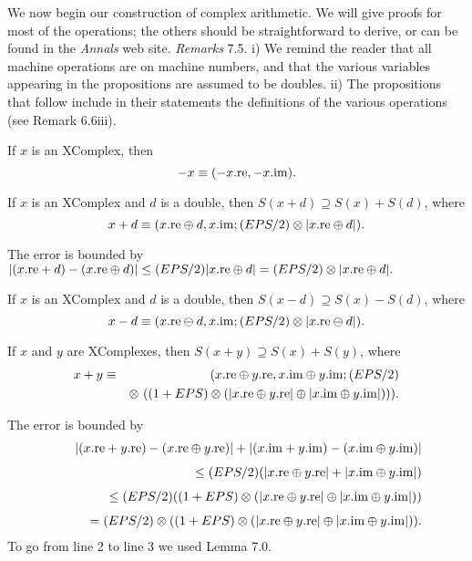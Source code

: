 We now begin our construction of complex arithmetic. We will give proofs for most of the operations; the others should be straightforward to derive,
or can be found in the {\it Annals} web site.
{\it Remarks} 7.5.
i) We remind the reader that all machine operations are on machine numbers, and that the various variables appearing in the propositions are assumed to be doubles.
ii) The propositions that follow include in their statements the definitions of the various operations (see Remark 6.6iii).

If $x$ is an {\rm XComplex,} then 
$$-x \equiv (-x.{\rm re},-x.{\rm im}).$$ 
\endproclaim

If $x$ is an {\rm XComplex} and $d$ is a double{\rm ,} then 
$S(x + d) \supseteq S(x) + S(d)${\rm ,} where 
 $$x + d \equiv (x.{\rm re} \oplus d, x.{\rm im};
(EPS/2)\otimes |x.{\rm re} \oplus d|).$$
\endproclaim

The  error is bounded by  
\hfill ${\displaystyle |(x.{\rm re} + d) - (x.{\rm re} \oplus d)|
\le (EPS/2) | x.{\rm re} \oplus d|
  =  (EPS/2) \otimes | x.{\rm re} \oplus d|.}$ \enddemo

If $x$ is an {\rm XComplex} and $d$ is a double{\rm ,} then 
$S(x - d) \supseteq S(x) - S(d)${\rm ,} where 
 $$x - d \equiv (x.{\rm re} \ominus d, x.{\rm im};
(EPS/2)\otimes |x.{\rm re} \ominus d|).$$ \endproclaim

If $x$ and $y$ are {\rm XComplexes,} then 
$S(x + y) \supseteq S(x) + S(y)${\rm ,} where
 \begin{eqnarray*}
x + y &\equiv& (x.{\rm re} \oplus y.{\rm re}, x.{\rm im} \oplus y.{\rm im};
(EPS/2)\\
&&  \otimes\ ((1 + EPS)  \otimes (|x.{\rm re} \oplus y.{\rm re}| \oplus |x.{\rm im} \oplus y.{\rm im}|))).
\end{eqnarray*}
\endproclaim
  

The error is bounded by
\begin{eqnarray*}
&&|(x.{\rm re} + y.{\rm re}) - (x.{\rm re} \oplus y.{\rm re})| + 
  |(x.{\rm im} + y.{\rm im}) - (x.{\rm im} \oplus y.{\rm im})|\\[4pt]
&&\qquad \le (EPS/2)(| x.{\rm re} \oplus y.{\rm re}| + 
   |x.{\rm im} \oplus y.{\rm im}|)\\[4pt]
&&\qquad \le (EPS/2)((1 + EPS) \otimes (| x.{\rm re} \oplus y.{\rm re}| \oplus 
   |x.{\rm im} \oplus y.{\rm im}|))\\[4pt]
&&\qquad = (EPS/2) \otimes ((1 + EPS) \otimes (| x.{\rm re} \oplus y.{\rm re}| \oplus 
   |x.{\rm im} \oplus y.{\rm im}|)).
\end{eqnarray*}
To go from line 2 to line 3 we used Lemma 7.0. \enddemo

